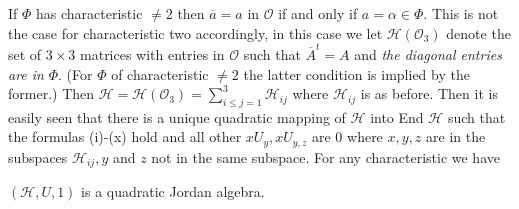 If $\Phi$ has characteristic $\neq 2$ then $\overline{a}=a$ in
$\mathcal{O}$ if and only if $a=\alpha \in \Phi$. This is not the
case for characteristic two accordingly, in this case we let
$\mathscr{H}(\mathcal{O}_3)$ denote the set of $3\times 3$ matrices
with entries in $\mathcal{O}$ such that $\overline{A}^{t}=A$ and {\em
  the diagonal entries are in} $\Phi$. (For $\Phi$ of characteristic
$\neq 2$ the latter condition is implied by the former.) Then
$\mathscr{H}=\mathscr{H}(\mathcal{O}_3)=\sum\limits_{i\le j=1}^{3}
\mathscr{H}_{ij}$ where $\mathscr{H}_{ij}$ is as before. Then it is
easily seen that there is a unique quadratic mapping of $\mathscr{H}$
into End $\mathscr{H}$ such that the formulas (i)-(x) hold and all
other $xU_y, xU_{y,z}$ are $0$ where $x,y,z$ are in the subspaces
$\mathscr{H}_{ij}, y$ and $z$ not in the same subspace. For any
characteristic we have
\begin{thm}\label{c1:thm5}
  $(\mathscr{H},U,1)$ is a quadratic Jordan algebra.
\end{thm}\pageoriginale

